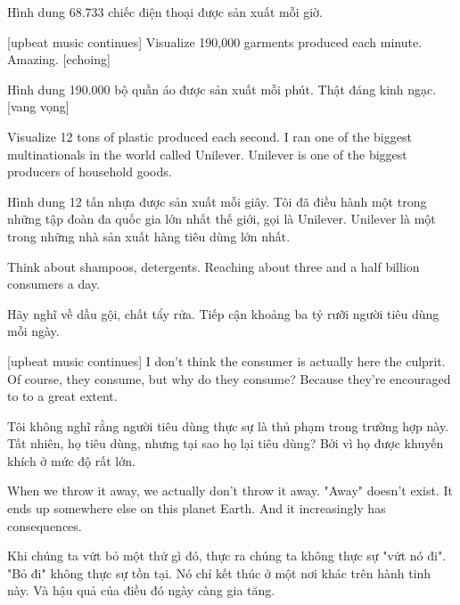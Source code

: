 \documentclass[a4paper]{article}
\begin{document}
	\begin{vietnamese-v2}
		 Hình dung 68.733 chiếc điện thoại được sản xuất mỗi giờ.
	\end{vietnamese-v2}
	
	[upbeat music continues]
	Visualize 190,000 garments produced each minute.
	Amazing. [echoing]
	
	\begin{vietnamese-v2}
		Hình dung 190.000 bộ quần áo được sản xuất mỗi phút. 
		Thật đáng kinh ngạc. [vang vọng]
	\end{vietnamese-v2}
	
	Visualize 12 tons of plastic produced each second. I ran one of the biggest multinationals in the world called Unilever.
	Unilever is one of the biggest producers of household goods.
	
	\begin{vietnamese-v2}
		Hình dung 12 tấn nhựa được sản xuất mỗi giây. Tôi đã điều hành một trong những tập đoàn đa quốc gia lớn nhất thế giới, gọi là Unilever. 
		Unilever là một trong những nhà sản xuất hàng tiêu dùng lớn nhất.
	\end{vietnamese-v2}
	
	Think about shampoos, detergents. Reaching about three and a half billion consumers a day.
	
	\begin{vietnamese-v2}
		Hãy nghĩ về dầu gội, chất tẩy rửa. Tiếp cận khoảng ba tỷ rưỡi người tiêu dùng mỗi ngày.
	\end{vietnamese-v2}
	
	[upbeat music continues]
	I don't think the consumer is actually here the culprit.
	Of course, they consume, but why do they consume?
	Because they're encouraged to to a great extent.
	
	\begin{vietnamese-v2}
		 Tôi không nghĩ rằng người tiêu dùng thực sự là thủ phạm trong trường hợp này. 
		Tất nhiên, họ tiêu dùng, nhưng tại sao họ lại tiêu dùng? 
		Bởi vì họ được khuyến khích ở mức độ rất lớn.
	\end{vietnamese-v2}
	
	When we throw it away, we actually don't throw it away.
	"Away" doesn't exist.
	It ends up somewhere else on this planet Earth.
	And it increasingly has consequences.
	
	\begin{vietnamese-v2}
		Khi chúng ta vứt bỏ một thứ gì đó, thực ra chúng ta không thực sự "vứt nó đi". 
		"Bỏ đi" không thực sự tồn tại. 
		Nó chỉ kết thúc ở một nơi khác trên hành tinh này. 
		Và hậu quả của điều đó ngày càng gia tăng.
	\end{vietnamese-v2}
	
\end{document}

